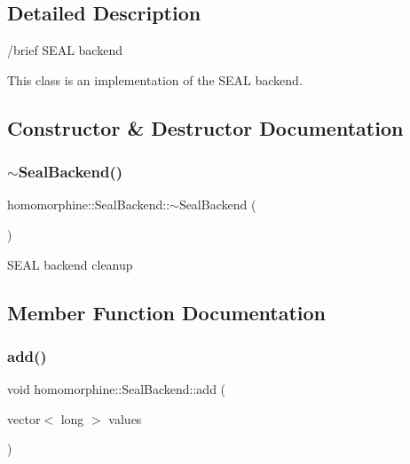 \subsection{Detailed Description}
/brief S\+E\+AL backend

This class is an implementation of the S\+E\+AL backend. 

\subsection{Constructor \& Destructor Documentation}
\mbox{\label{classhomomorphine_1_1_seal_backend_a7224092a19a3472a5143d16b80fb9775}} 
\subsubsection{\texorpdfstring{$\sim$\+Seal\+Backend()}{~SealBackend()}}
{\footnotesize\ttfamily homomorphine\+::\+Seal\+Backend\+::$\sim$\+Seal\+Backend (\begin{DoxyParamCaption}{ }\end{DoxyParamCaption})}

S\+E\+AL backend cleanup 

\subsection{Member Function Documentation}
\mbox{\label{classhomomorphine_1_1_seal_backend_ae868a22dda1eed2246c59aa831707bf1}} 
\subsubsection{\texorpdfstring{add()}{add()}\hspace{0.1cm}{\footnotesize\ttfamily [1/2]}}
{\footnotesize\ttfamily void homomorphine\+::\+Seal\+Backend\+::add (\begin{DoxyParamCaption}\item[{vector$<$ long $>$}]{values }\end{DoxyParamCaption})\hspace{0.3cm}{\ttfamily [virtual]}}

